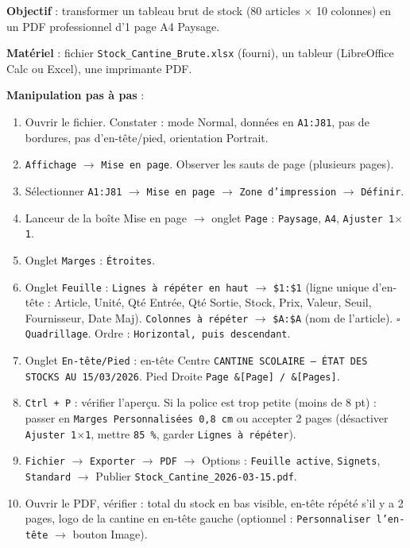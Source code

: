 \documentclass[11pt]{article}
\begin{document}
\begin{experience}
\textbf{Objectif} : transformer un tableau brut de stock (80 articles $\times$ 10 colonnes) en un PDF professionnel d'1 page A4 Paysage.

\textbf{Matériel} : fichier \texttt{Stock\_Cantine\_Brute.xlsx} (fourni), un tableur (LibreOffice Calc ou Excel), une imprimante PDF.

\textbf{Manipulation pas à pas} :
\begin{enumerate}
  \item Ouvrir le fichier. Constater : mode Normal, données en \texttt{A1:J81}, pas de bordures, pas d'en-tête/pied, orientation Portrait.
  \item \texttt{Affichage} $\rightarrow$ \texttt{Mise en page}. Observer les sauts de page (plusieurs pages).
  \item Sélectionner \texttt{A1:J81} $\rightarrow$ \texttt{Mise en page} $\rightarrow$ \texttt{Zone d'impression} $\rightarrow$ \texttt{Définir}.
  \item Lanceur de la boîte Mise en page $\rightarrow$ onglet \texttt{Page} : \texttt{Paysage}, \texttt{A4}, \texttt{Ajuster 1$\times$1}.
  \item Onglet \texttt{Marges} : \texttt{Étroites}.
  \item Onglet \texttt{Feuille} : \texttt{Lignes à répéter en haut} $\rightarrow$ \texttt{\$1:\$1} (ligne unique d'en-tête : Article, Unité, Qté Entrée, Qté Sortie, Stock, Prix, Valeur, Seuil, Fournisseur, Date Maj). \texttt{Colonnes à répéter} $\rightarrow$ \texttt{\$A:\$A} (nom de l'article). $\square$ \texttt{Quadrillage}. Ordre : \texttt{Horizontal, puis descendant}.
  \item Onglet \texttt{En-tête/Pied} : en-tête Centre \texttt{CANTINE SCOLAIRE — ÉTAT DES STOCKS AU 15/03/2026}. Pied Droite \texttt{Page \&[Page] / \&[Pages]}.
  \item \texttt{Ctrl + P} : vérifier l'aperçu. Si la police est trop petite (moins de 8 pt) : passer en \texttt{Marges Personnalisées 0,8 cm} ou accepter 2 pages (désactiver \texttt{Ajuster 1$\times$1}, mettre \texttt{85 \%}, garder \texttt{Lignes à répéter}).
  \item \texttt{Fichier} $\rightarrow$ \texttt{Exporter} $\rightarrow$ \texttt{PDF} $\rightarrow$ Options : \texttt{Feuille active}, \texttt{Signets}, \texttt{Standard} $\rightarrow$ Publier \texttt{Stock\_Cantine\_2026-03-15.pdf}.
  \item Ouvrir le PDF, vérifier : total du stock en bas visible, en-tête répété s'il y a 2 pages, logo de la cantine en en-tête gauche (optionnel : \texttt{Personnaliser l'en-tête} $\rightarrow$ bouton Image).
\end{enumerate}


\end{experience}
\end{document}
